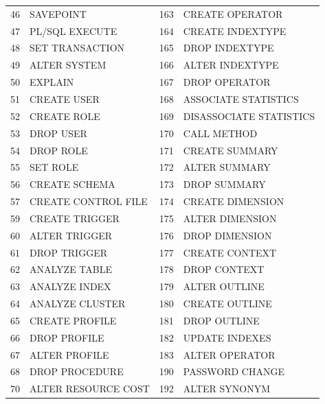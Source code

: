 \begin{appendix}
\begin{longtable}[]{@{}rl|rl@{}}
46   & SAVEPOINT                    & 163 & CREATE OPERATOR              \\
47   & PL/SQL EXECUTE               & 164 & CREATE INDEXTYPE             \\
48   & SET TRANSACTION              & 165 & DROP INDEXTYPE               \\
49   & ALTER SYSTEM                 & 166 & ALTER INDEXTYPE              \\
50   & EXPLAIN                      & 167 & DROP OPERATOR                \\
51   & CREATE USER                  & 168 & ASSOCIATE STATISTICS         \\
52   & CREATE ROLE                  & 169 & DISASSOCIATE STATISTICS      \\
53   & DROP USER                    & 170 & CALL METHOD                  \\
54   & DROP ROLE                    & 171 & CREATE SUMMARY               \\
55   & SET ROLE                     & 172 & ALTER SUMMARY                \\
56   & CREATE SCHEMA                & 173 & DROP SUMMARY                 \\
57   & CREATE CONTROL FILE          & 174 & CREATE DIMENSION             \\
59   & CREATE TRIGGER               & 175 & ALTER DIMENSION              \\
60   & ALTER TRIGGER                & 176 & DROP DIMENSION               \\
61   & DROP TRIGGER                 & 177 & CREATE CONTEXT               \\
62   & ANALYZE TABLE                & 178 & DROP CONTEXT                 \\
63   & ANALYZE INDEX                & 179 & ALTER OUTLINE                \\
64   & ANALYZE CLUSTER              & 180 & CREATE OUTLINE               \\
65   & CREATE PROFILE               & 181 & DROP OUTLINE                 \\
66   & DROP PROFILE                 & 182 & UPDATE INDEXES               \\
67   & ALTER PROFILE                & 183 & ALTER OPERATOR               \\
68   & DROP PROCEDURE               & 190 & PASSWORD CHANGE              \\
70   & ALTER RESOURCE COST          & 192 & ALTER SYNONYM                \\

\end{longtable}
\end{appendix}
